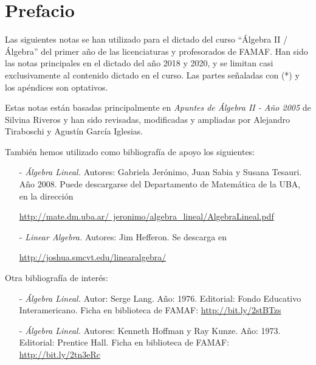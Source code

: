\documentclass[a4paper,12pt,twoside,spanish,reqno]{amsbook}
\theoremstyle{definition}
\theoremstyle{remark}
\begin{document}
    \tableofcontents 
    
    
    \chapter*{Prefacio} 

    
    Las siguientes notas se han utilizado para el dictado del curso ``Álgebra II / Álgebra'' del primer año de las licenciaturas y profesorados de FAMAF. 	Han sido las notas principales en el dictado del año 2018 y 2020, y se limitan casi exclusivamente al contenido dictado en el curso. Las partes señaladas con (*) y los apéndices son optativos.
    
    Estas notas están basadas principalmente en \textit{Apuntes de Álgebra II - Año 2005} de Silvina Riveros y han sido revisadas, modificadas y ampliadas por Alejandro Tiraboschi  y Agustín García Iglesias. 
    
    También hemos utilizado como bibliografía de apoyo  los siguientes: 
    
    \begin{enumerate}
        \item [-] \textit{Álgebra Lineal.} Autores: Gabriela Jerónimo, Juan Sabia y Susana Tesauri. Año 2008. Puede descargarse del Departamento de Matemática de la UBA, en la dirección
        
        \href{http://mate.dm.uba.ar/~jeronimo/algebra_lineal/AlgebraLineal.pdf}	 {http://mate.dm.uba.ar/~jeronimo/algebra\_lineal/AlgebraLineal.pdf}
        \item [- ] \textit{Linear Algebra.} Autores: Jim Hefferon. Se descarga en
        
        \href{http://joshua.smcvt.edu/linearalgebra/}{http://joshua.smcvt.edu/linearalgebra/}
    \end{enumerate}
    
    
    Otra bibliografía de interés:
        \begin{enumerate}
            \item [-] \textit{Álgebra Lineal.}  Autor: Serge Lang. Año: 1976. Editorial: Fondo Educativo Interamericano. Ficha en biblioteca de FAMAF: \href{http://bit.ly/2stBTzs}{http://bit.ly/2stBTzs}
            \item [-] \textit{Álgebra Lineal.} Autores: Kenneth Hoffman y Ray Kunze.  Año: 1973. Editorial: Prentice Hall. Ficha en biblioteca de FAMAF:  \href{http://bit.ly/2tn3eRc}{http://bit.ly/2tn3eRc}
        \end{enumerate}
    
\end{document}
